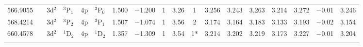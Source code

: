 \documentclass[traditabstract]{aa}
\newcommand{\pst}{\phantom{*}}
\newcommand{\phz}{\phantom{0}}
\begin{document}
\begin{center}
\begin{mpsupertabular}{r@{}c@{\ \ \ }r@{~}l@{\ }r@{~}l@{\ \ \ }c@{\ \ \ }c@{\ \ \ }c@{\ \ \ }c@{\ \ \ }c@{\ \ \ }c@{\ \ \ }c@{\ \ \ }c@{\ \ \ }c@{\ \ \ }c@{\ \ \ }r@{\ \ \ }c}
566.9055 & &  \footnotesize   3d$^2$ &\footnotesize $^3$P$_1$            &\footnotesize   4p      &\footnotesize $^3$P$_0$            & 1.500 & $-$1.200 &  1 & 3.26 & 1\pst      & 3.256 & 3.243 & 3.263 & 3.214 & 3.272 & $-$0.01\phz & 3.246 \\
568.4214 & &  \footnotesize   3d$^2$ &\footnotesize $^3$P$_2$            &\footnotesize   4p      &\footnotesize $^3$P$_1$            & 1.507 & $-$1.074 &  1 & 3.56 & 2\pst      & 3.174 & 3.164 & 3.183 & 3.133 & 3.193 & $-$0.02\phz & 3.154 \\
660.4578 & &  \footnotesize   3d$^2$ &\footnotesize $^1$D$_2$            &\footnotesize   4p      &\footnotesize $^1$D$_2$            & 1.357 & $-$1.309 &  1 & 3.54 & 1*         & 3.214 & 3.202 & 3.219 & 3.173 & 3.227 & $-$0.01\phz & 3.204 \\
   & & & & & & & & & & & & & & & \\


\end{mpsupertabular}
\end{center}
\end{document}
